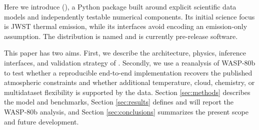 Here we introduce \ROBERT{} (), a Python package built around
explicit scientific data models and independently testable numerical
components. Its initial science focus is JWST thermal emission, while its
interfaces avoid encoding an emission-only assumption. The distribution is
named  and is currently pre-release software.

This paper has two aims. First, we describe the architecture, physics, inference
interfaces, and validation strategy of \ROBERT{}. Secondly, we use a reanalysis
of WASP-80b to test whether a reproducible end-to-end implementation recovers
the published atmospheric constraints and whether additional temperature,
cloud, chemistry, or multidataset flexibility is supported by the data. Section
\ref{sec:methods} describes the model and benchmarks, Section
\ref{sec:results} defines and will report the WASP-80b analysis, and Section
\ref{sec:conclusions} summarizes the present scope and future development.

